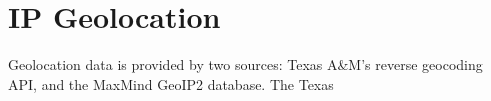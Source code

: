 \section{IP Geolocation}\label{sec:background_geolocation}
Geolocation data is provided by two sources: Texas A\&M's reverse geocoding API, and the MaxMind GeoIP2 database. The Texas